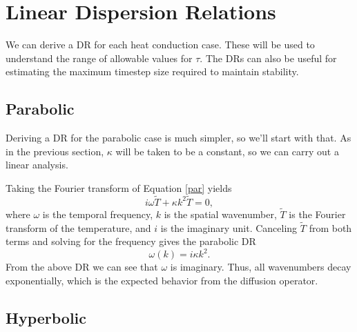 \documentclass[iop]{emulateapj}
\begin{document}
	
	\section{Linear Dispersion Relations} \label{linear_sec}
	
			We can derive a \ac{DR} for each heat conduction case.
				These will be used to understand the range of allowable values for $\tau$.
				The \ac{DR}s can also be useful for estimating the maximum timestep size required to maintain stability.
				
		\subsection{Parabolic}
		
			Deriving a \ac{DR} for the parabolic case is much simpler, so we'll start with that.
				As in the previous section, $\kappa$ will be taken to be a constant, so we can carry out a linear analysis.
				
			Taking the Fourier transform of Equation \ref{par} yields
			\begin{equation}
				i \omega \tilde{T} + \kappa k^2 \tilde{T} = 0,
			\end{equation}
			where $\omega$ is the temporal frequency, $k$ is the spatial wavenumber, $\tilde{T}$ is the Fourier transform of the temperature, and $i$ is the imaginary unit.
			Canceling $\tilde{T}$ from both terms and solving for the frequency gives the parabolic \ac{DR}
			\begin{equation}
				\omega(k) = i \kappa k^2.
			\end{equation}
			From the above \ac{DR} we can see that $\omega$ is imaginary. Thus, all wavenumbers decay exponentially, which is the expected behavior from the diffusion operator.
					
		\subsection{Hyperbolic}
		
\end{document}
